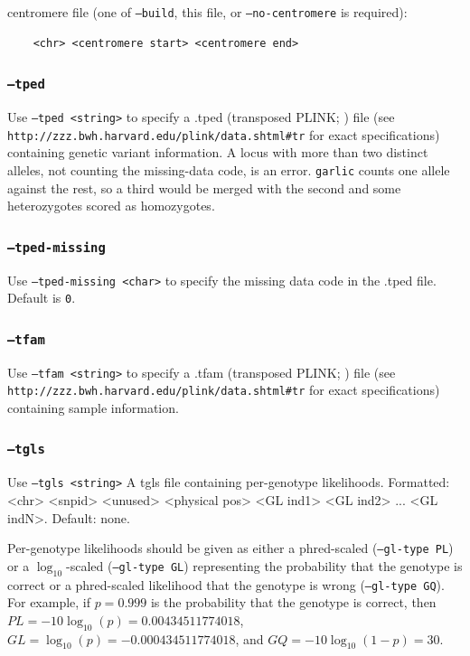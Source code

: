 \documentclass[12pt]{article}%
\begin{document}
\noindent centromere file (one of {\tt --build}, this file, or {\tt --no-centromere} is required):
\begin{verbatim}
	<chr> <centromere start> <centromere end>
\end{verbatim}

\subsubsection{{\tt --tped}}

Use {\tt --tped <string>} to specify a .tped (transposed PLINK; \cite{PurcellEtAl07}) file (see \\{\tt http://zzz.bwh.harvard.edu/plink/data.shtml\#tr} for exact specifications) containing genetic variant information.  A locus with more than two distinct alleles, not counting the missing-data code, is an error.  {\tt garlic} counts one allele against the rest, so a third would be merged with the second and some heterozygotes scored as homozygotes.

\subsubsection{{\tt --tped-missing}}

Use {\tt --tped-missing <char>} to specify the missing data code in the .tped file.  Default is {\tt 0}.  


\subsubsection{{\tt --tfam}}

Use {\tt --tfam <string>} to specify a .tfam (transposed PLINK; \cite{PurcellEtAl07}) file (see \\{\tt http://zzz.bwh.harvard.edu/plink/data.shtml\#tr} for exact specifications) containing sample information.

\subsubsection{{\tt --tgls}}

Use {\tt --tgls <string>} A tgls file containing per-genotype likelihoods. Formatted: <chr> <snpid> <unused> <physical pos> <GL ind1> <GL ind2> ... <GL indN>. Default: none.

Per-genotype likelihoods should be given as either a phred-scaled ({\tt --gl-type PL}) or a $\log_{10}$-scaled ({\tt --gl-type GL}) representing the probability that the genotype is correct or a phred-scaled likelihood that the genotype is wrong ({\tt --gl-type GQ}).  For example, if $p = 0.999$ is the probability that the genotype is correct, then $PL = -10\log_{10}(p) = 0.00434511774018$, $GL = \log_{10}(p) = -0.000434511774018$, and $GQ = -10\log_{10}(1-p) = 30$.
\end{document}
